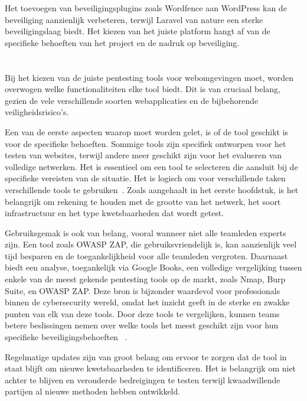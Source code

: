 Het toevoegen van beveiligingsplugins zoals Wordfence aan WordPress kan de beveiliging aanzienlijk verbeteren, terwijl Laravel van nature een 
sterke beveiligingslaag biedt. Het kiezen van het juiste platform hangt af van de specifieke behoeften van het project en de nadruk op beveiliging.
\section{}
\label{sec:Webomgevingen}
Bij het kiezen van de juiste pentesting tools voor webomgevingen moet, worden overwogen welke functionaliteiten 
elke tool biedt. Dit is van cruciaal belang, gezien de vele verschillende soorten webapplicaties en de bijbehorende veiligheidsrisico's.

Een van de eerste aspecten waarop moet worden gelet, is of de tool geschikt is voor de specifieke behoeften. Sommige tools 
zijn specifiek ontworpen voor het testen van websites, terwijl andere meer geschikt zijn voor het evalueren van volledige 
netwerken. Het is essentieel om een tool te selecteren die aansluit bij de specifieke vereisten van de situatie. Het 
is logisch om voor verschillende taken verschillende tools te gebruiken~\autocite{Deepikakongara2023}.
Zoals aangehaalt in het eerste hoofdstuk, is het belangrijk om rekening te houden met de grootte van het netwerk, 
het soort infrastructuur en het type kwetsbaarheden dat wordt getest.

Gebruiksgemak is ook van belang, vooral wanneer niet alle teamleden experts zijn. Een tool zoals OWASP ZAP, 
die gebruiksvriendelijk is, kan aanzienlijk veel tijd besparen en de toegankelijkheid voor alle teamleden vergroten.
Daarnaast biedt een analyse, toegankelijk via Google Books, een volledige vergelijking tussen enkele van de meest gekende pentesting tools op de markt, 
zoals Nmap, Burp Suite, en OWASP ZAP. Deze bron is bijzonder waardevol voor professionals binnen de cybersecurity wereld, omdat het inzicht geeft in de sterke en zwakke 
punten van elk van deze tools. Door deze tools te vergelijken, kunnen teams betere beslissingen nemen over welke tools het meest geschikt zijn 
voor hun specifieke beveiligingsbehoeften ~\autocite{Velu2022}.

Regelmatige updates zijn van groot belang om ervoor te zorgen dat de tool in staat blijft om nieuwe kwetsbaarheden te 
identificeren. Het is belangrijk om niet achter te blijven en verouderde bedreigingen te testen terwijl kwaadwillende 
partijen al nieuwe methoden hebben ontwikkeld.

